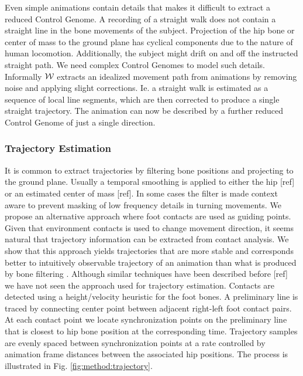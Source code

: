 Even simple animations contain details that makes it difficult to extract a reduced Control Genome. A recording of a straight walk does not contain a straight line in the bone movements of the subject. Projection of the hip bone or center of mass to the ground plane has cyclical components due to the nature of human locomotion. Additionally, the subject might drift on and off the instructed straight path. We need complex Control Genomes to model such details. 
Informally $\mathcal{W}$ extracts an idealized movement path from animations by removing noise and applying slight corrections. Ie. a straight walk is estimated as a sequence of local line segments, which are then corrected to produce a single straight trajectory. The animation can now be described by a further reduced Control Genome of just a single direction.

\subsubsection{\bf Trajectory Estimation}
It is common to extract trajectories by filtering bone positions and projecting to the ground plane. Usually a temporal smoothing is applied to either the hip [ref] or an estimated center of mass [ref]. In some cases the filter is made context aware to prevent masking of low frequency details in turning movements. We propose an alternative approach where foot contacts are used as guiding points. Given that environment contacts is used to change movement direction, it seems natural that trajectory information can be extracted from contact analysis. We show that this approach yields trajectories that are more stable and corresponds better to intuitively observable trajectory of an animation than what is produced by bone filtering .
%
Although similar techniques have been described before [ref] we have not seen the approach used for trajectory estimation.
Contacts are detected using a height/velocity heuristic for the foot bones. A preliminary line is traced by connecting center point between adjacent right-left foot contact pairs. At each contact point we locate synchronization points on the preliminary line that is closest to hip bone position at the corresponding time. Trajectory samples are evenly spaced between synchronization points at a rate controlled by animation frame distances between the associated hip positions. The process is illustrated in Fig. \ref{fig:method:trajectory}. 
